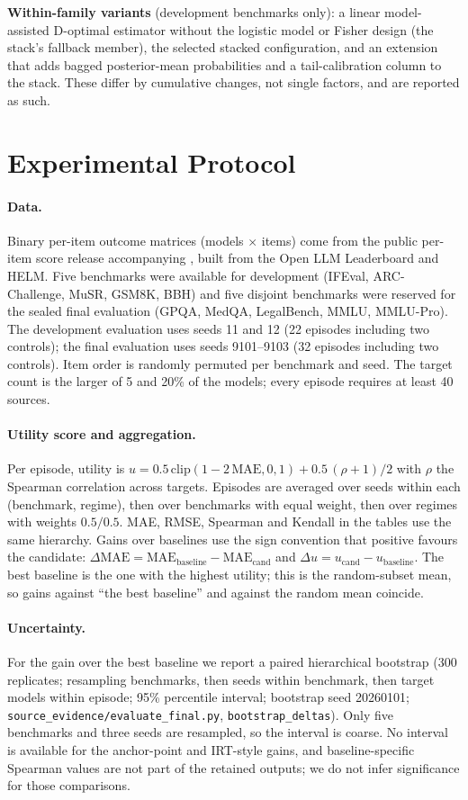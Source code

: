 \documentclass{article}
\begin{document}
\textbf{Within-family variants} (development benchmarks only): a linear model-assisted D-optimal estimator without the logistic model or Fisher design (the stack's fallback member), the selected stacked configuration, and an extension that adds bagged posterior-mean probabilities and a tail-calibration column to the stack. These differ by cumulative changes, not single factors, and are reported as such.

\section{Experimental Protocol}
\label{sec:protocol}
\paragraph{Data.} Binary per-item outcome matrices (models $\times$ items) come from the public per-item score release accompanying \citet{Zhang2025HowBP}, built from the Open LLM Leaderboard and HELM. Five benchmarks were available for development (IFEval, ARC-Challenge, MuSR, GSM8K, BBH) and five disjoint benchmarks were reserved for the sealed final evaluation (GPQA, MedQA, LegalBench, MMLU, MMLU-Pro). The development evaluation uses seeds 11 and 12 (22 episodes including two controls); the final evaluation uses seeds 9101--9103 (32 episodes including two controls). Item order is randomly permuted per benchmark and seed. The target count is the larger of 5 and 20\% of the models; every episode requires at least 40 sources.

\paragraph{Utility score and aggregation.} Per episode, utility is $u=0.5\,\mathrm{clip}(1-2\,\mathrm{MAE},0,1)+0.5\,(\rho+1)/2$ with $\rho$ the Spearman correlation across targets. Episodes are averaged over seeds within each (benchmark, regime), then over benchmarks with equal weight, then over regimes with weights $0.5/0.5$. MAE, RMSE, Spearman and Kendall in the tables use the same hierarchy. Gains over baselines use the sign convention that positive favours the candidate: $\Delta\mathrm{MAE}=\mathrm{MAE}_{\text{baseline}}-\mathrm{MAE}_{\text{cand}}$ and $\Delta u=u_{\text{cand}}-u_{\text{baseline}}$. The best baseline is the one with the highest utility; this is the random-subset mean, so gains against ``the best baseline'' and against the random mean coincide.

\paragraph{Uncertainty.} For the gain over the best baseline we report a paired hierarchical bootstrap (300 replicates; resampling benchmarks, then seeds within benchmark, then target models within episode; 95\% percentile interval; bootstrap seed 20260101; \texttt{source\_evidence/evaluate\_final.py}, \texttt{bootstrap\_deltas}). Only five benchmarks and three seeds are resampled, so the interval is coarse. No interval is available for the anchor-point and IRT-style gains, and baseline-specific Spearman values are not part of the retained outputs; we do not infer significance for those comparisons.
\end{document}
